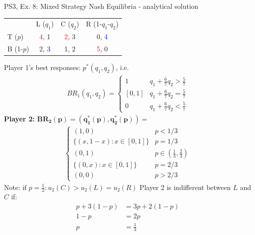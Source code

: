 \begin{frame}{PS3, Ex. 8: Mixed Strategy Nash Equilibria - analytical solution}
  \begin{multicols}{2}
    \begin{table}
      \begin{tabular}{l|c|c|c|}
          \multicolumn{1}{c}{}  & \multicolumn{1}{c}{L ($q_1$)} & \multicolumn{1}{c}{C ($q_2$)} & \multicolumn{1}{c}{R (1-$q_1$-$q_2$)} \\\cline{2-4}
          T ($p$)   & \textcolor{red}{4}, 1 & \textcolor{red}{2}, 3 & 0, \textcolor{blue}{4} \\\cline{2-4}
          B (1-$p$) & 2, \textcolor{blue}{3} & 1, 2 & \textcolor{red}{5}, 0 \\\cline{2-4}
      \end{tabular}
    \end{table}
    Player 1's best responses: $p^{*}(q_1,q_2)$, i.e.
    \begin{align*}
      BR_1(q_1,q_2)=
      \left\{ \begin{array}{ll}
          1                 & q_1 + \frac{6}{7}q_2 > \frac{5}{7}\\
          \left[0,1\right]  & q_1 + \frac{6}{7}q_2 = \frac{5}{7}\\
          0                 & q_1 + \frac{6}{7}q_2 < \frac{5}{7}
      \end{array}\right.
    \end{align*}
    \textbf{Player 2:} $\bm{BR_2(p)=\left(q_1^{*}(p),q_2^{*}(p)\right)}=$
    \begin{align*}
      \left\{ \begin{array}{ll}
          (1,0)                 & p < 1/3 \\
          \{(x,1-x):x\in[0,1]\} & p = 1/3 \\
          (0,1)                 & p\in\left(\frac{1}{3},\frac{2}{3}\right)\\
          \{(0,x):x\in[0,1]\}   & p = 2/3 \\
          (0,0)                 & p > 2/3
      \end{array}\right.
    \end{align*}
    Note: if $p=\frac{1}{2}:u_2(C)>u_2(L)=u_2(R)$
  \vfill\null \columnbreak
    Player 2 is indifferent between $L$ and $C$ if:
    \begin{align*}
      p+3(1-p)&= 3p + 2(1-p) \\
      1-p     &= 2p \\
      p       &= \frac{1}{3}
    \end{align*}

\end{multicols}
\end{frame}
